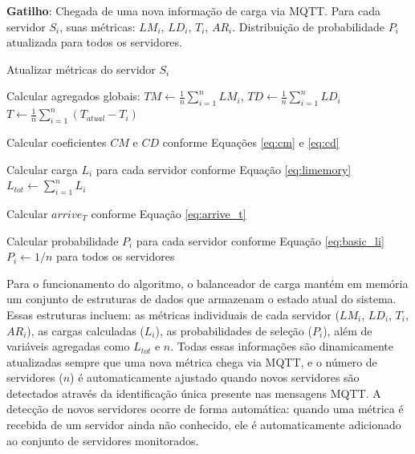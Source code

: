 \begin{algorithm}[H]
\caption{Atualização da distribuição de probabilidade} \label{alg:atualizacao_distribuicao_probabilidade}
\begin{algorithmic}[1]
\Statex \textbf{Gatilho}: Chegada de uma nova informação de carga via MQTT.
\Require
    \Statex Para cada servidor $S_i$, suas métricas: $LM_i$, $LD_i$, $T_i$, $AR_i$.
\Ensure
    \Statex Distribuição de probabilidade $P_i$ atualizada para todos os servidores.

    \State Atualizar métricas do servidor $S_i$
    
    \State Calcular agregados globais:
    \State $TM \leftarrow \frac{1}{n} \sum_{i=1}^{n} LM_i$, $TD \leftarrow \frac{1}{n} \sum_{i=1}^{n} LD_i$
    \State $T \leftarrow \frac{1}{n} \sum_{i=1}^{n} (T_{atual} - T_i)$ 
    
    \State Calcular coeficientes $CM$ e $CD$ conforme Equações \ref{eq:cm} e \ref{eq:cd}
    
    \State Calcular carga $L_i$ para cada servidor conforme Equação \ref{eq:limemory}
    \State $L_{tot} \leftarrow \sum_{i=1}^{n} L_i$
    
    \State Calcular $arrive_T$ conforme Equação \ref{eq:arrive_t}
    
    \State Calcular probabilidade $P_i$ para cada servidor conforme Equação \ref{eq:basic_li}
        \State $P_i \leftarrow 1/n$ para todos os servidores 
    \EndIf
\EndProcedure
\end{algorithmic}
\end{algorithm}

Para o funcionamento do algoritmo, o balanceador de carga mantém em memória um conjunto de estruturas de dados que armazenam o estado atual do sistema. Essas estruturas incluem: as métricas individuais de cada servidor ($LM_i$, $LD_i$, $T_i$, $AR_i$), as cargas calculadas ($L_i$), as probabilidades de seleção ($P_i$), além de variáveis agregadas como $L_{tot}$ e $n$. Todas essas informações são dinamicamente atualizadas sempre que uma nova métrica chega via MQTT, e o número de servidores ($n$) é automaticamente ajustado quando novos servidores são detectados através da identificação única presente nas mensagens MQTT. A detecção de novos servidores ocorre de forma automática: quando uma métrica é recebida de um servidor ainda não conhecido, ele é automaticamente adicionado ao conjunto de servidores monitorados.

